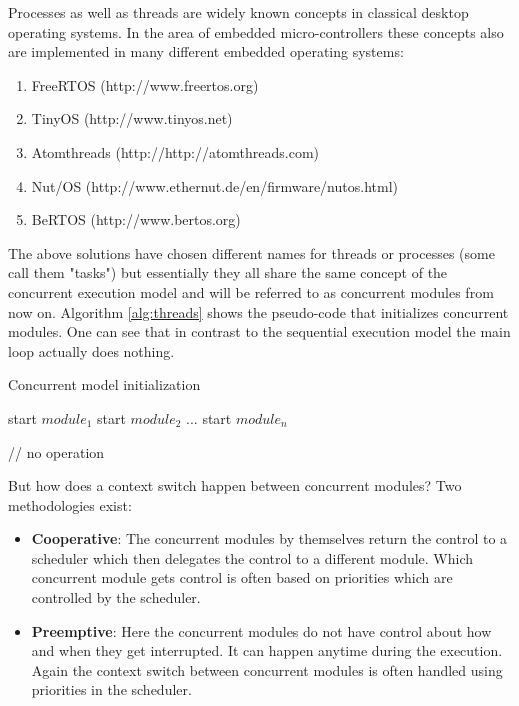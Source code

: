 Processes as well as threads are widely known concepts in classical desktop operating systems. In the area of embedded micro-controllers these concepts also are implemented in many different embedded operating systems:

\begin{enumerate}
\item FreeRTOS (http://www.freertos.org)
\item TinyOS (http://www.tinyos.net)
\item Atomthreads (http://http://atomthreads.com)
\item Nut/OS (http://www.ethernut.de/en/firmware/nutos.html)
\item BeRTOS (http://www.bertos.org)
\end{enumerate}

The above solutions have chosen different names for threads or processes (some call them "tasks") but essentially they all share the same concept of the concurrent execution model and will be referred to as concurrent modules from now on. Algorithm \ref{alg:threads} shows the pseudo-code that initializes concurrent modules. One can see that in contrast to the sequential execution model the main loop actually does nothing.

\begin{algorithm}[H]
\caption{Concurrent model initialization}
\label{alg:threads}
\begin{algorithmic}

\STATE start $module_1$
\STATE start $module_2$
\STATE ...
\STATE start $module_n$

    \STATE // no operation
\ENDWHILE
\end{algorithmic}
\end{algorithm}

But how does a context switch happen between concurrent modules? Two methodologies exist:

\begin{itemize}
\item \textbf{Cooperative}: The concurrent modules by themselves return the control to a scheduler which then delegates the control to a different module. Which concurrent module gets control is often based on priorities which are controlled by the scheduler.
\item \textbf{Preemptive}: Here the concurrent modules do not have control about how and when they get interrupted. It can happen anytime during the execution. Again the context switch between concurrent modules is often handled using priorities in the scheduler.
\end{itemize}

